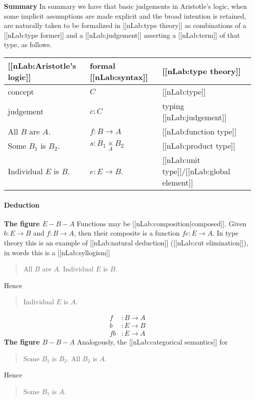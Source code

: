 \documentclass[12pt,titlepage]{article}
\theoremstyle{plain}
\theoremstyle{definition}
\theoremstyle{remark}
\begin{document}
\textbf{Summary}
In summary we have that basic judgements in Aristotle's logic, when some implicit assumptions are made explicit and the broad intention is retained, are naturally taken to be formalized in [[nLab:type theory]] as combinations of a [[nLab:type former]] and a [[nLab:judgement]] asserting a [[nLab:term]] of that type, as follows.
\begin{tabular}{l|l|l}
[[nLab:Aristotle's logic]]&formal [[nLab:syntax]]&[[nLab:type theory]]\\
\hline 
concept&$C$&[[nLab:type]]\\
judgement&$c \colon C$&typing [[nLab:judgement]]\\
All $B$ are $A$.&$f \colon B \longrightarrow A$&[[nLab:function type]]\\
Some $B_1$ is $B_2$.&$s \colon B_1 \underset{A}{\times} B_2$&[[nLab:product type]]\\
Individual $E$ is $B$.&$e \colon E \to B$.&[[nLab:unit type]]/[[nLab:global element]]\\
\end{tabular}
\hypertarget{deduction}{}\paragraph*{{Deduction}}\label{deduction}
\textbf{The figure $E-B-A$}
Functions may be [[nLab:composition|composed]]. Given $b \colon E \to B$ and $f \colon B \to A$, then their composite is a function $f e \colon E \to A$. In type theory this is an example of [[nLab:natural deduction]] ([[nLab:cut elimination]]), in words this is a [[nLab:syllogism]]
\begin{quote}%
All $B$ are $A$.
Individual $E$ is $B$.
\end{quote}
Hence
\begin{quote}%
Individual $E$ is $A$.
\end{quote}
\begin{displaymath}
\begin{aligned}
    f & \colon B \longrightarrow A
    \\
    b & \colon E \longrightarrow B
    \\
    f b & \colon E \longrightarrow A
  \end{aligned}
\end{displaymath}
\textbf{The figure $B-B-A$}
Analogously, the [[nLab:categorical semantics]] for
\begin{quote}%
Some $B_1$ is $B_2$.
All $B_2$ is $A$.
\end{quote}
Hence
\begin{quote}%
Some $B_1$ is $A$.
\end{quote}
\end{document}
